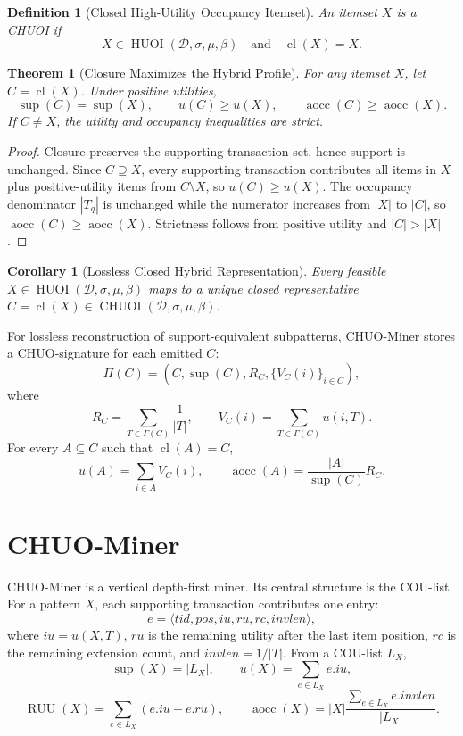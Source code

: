 \documentclass[11pt,a4paper]{article}
\newtheorem{definition}{Definition}
\newtheorem{theorem}{Theorem}
\newtheorem{corollary}{Corollary}
\newcommand{\D}{\mathcal{D}}
\newcommand{\GammaSet}{\Gamma}
\newcommand{\supp}{\operatorname{sup}}
\newcommand{\cl}{\operatorname{cl}}
\newcommand{\aocc}{\operatorname{aocc}}
\newcommand{\CHUOI}{\operatorname{CHUOI}}
\newcommand{\HUOI}{\operatorname{HUOI}}
\newcommand{\RUU}{\operatorname{RUU}}
\begin{document}
\begin{definition}[Closed High-Utility Occupancy Itemset]
An itemset \(X\) is a CHUOI if
\[
X\in \HUOI(\D,\sigma,\mu,\beta)
\quad\text{and}\quad
\cl(X)=X.
\]
\end{definition}

\begin{theorem}[Closure Maximizes the Hybrid Profile]
For any itemset \(X\), let \(C=\cl(X)\). Under positive utilities,
\[
\supp(C)=\supp(X),\qquad u(C)\ge u(X),\qquad \aocc(C)\ge\aocc(X).
\]
If \(C\neq X\), the utility and occupancy inequalities are strict.
\end{theorem}

\begin{proof}
Closure preserves the supporting transaction set, hence support is unchanged. Since \(C\supseteq X\), every supporting transaction contributes all items in \(X\) plus positive-utility items from \(C\setminus X\), so \(u(C)\ge u(X)\). The occupancy denominator \(|T_q|\) is unchanged while the numerator increases from \(|X|\) to \(|C|\), so \(\aocc(C)\ge\aocc(X)\). Strictness follows from positive utility and \(|C|>|X|\).
\end{proof}

\begin{corollary}[Lossless Closed Hybrid Representation]
Every feasible \(X\in\HUOI(\D,\sigma,\mu,\beta)\) maps to a unique closed representative \(C=\cl(X)\in\CHUOI(\D,\sigma,\mu,\beta)\).
\end{corollary}

For lossless reconstruction of support-equivalent subpatterns, CHUO-Miner stores a CHUO-signature for each emitted \(C\):
\[
\Pi(C)=\left(C,\supp(C),R_C,\{V_C(i)\}_{i\in C}\right),
\]
where
\[
R_C=\sum_{T\in\GammaSet(C)}\frac{1}{|T|},
\qquad
V_C(i)=\sum_{T\in\GammaSet(C)}u(i,T).
\]
For every \(A\subseteq C\) such that \(\cl(A)=C\),
\[
u(A)=\sum_{i\in A}V_C(i),
\qquad
\aocc(A)=\frac{|A|}{\supp(C)}R_C.
\]

\section{CHUO-Miner}

CHUO-Miner is a vertical depth-first miner. Its central structure is the COU-list. For a pattern \(X\), each supporting transaction contributes one entry:
\[
e=\langle tid,pos,iu,ru,rc,invlen\rangle,
\]
where \(iu=u(X,T)\), \(ru\) is the remaining utility after the last item position, \(rc\) is the remaining extension count, and \(invlen=1/|T|\). From a COU-list \(L_X\),
\[
\supp(X)=|L_X|,
\qquad
u(X)=\sum_{e\in L_X}e.iu,
\]
\[
\RUU(X)=\sum_{e\in L_X}(e.iu+e.ru),
\qquad
\aocc(X)=|X|\frac{\sum_{e\in L_X}e.invlen}{|L_X|}.
\]
\end{document}
